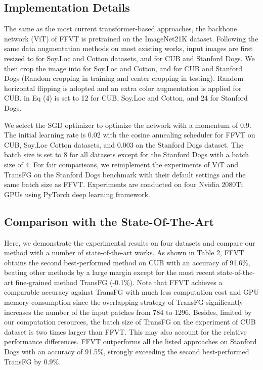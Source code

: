 \documentclass{bmvc2k}
\begin{document}
\subsection{Implementation Details}
The same as the most current transformer-based approaches, the backbone network (ViT) of FFVT is pretrained on the ImageNet21K dataset. Following the same data augmentation methods on most existing works, input images are first resized to  for Soy.Loc and Cotton datasets, and  for CUB and Stanford Dogs. We then crop the image into  for Soy.Loc and Cotton, and  for CUB and Stanford Dogs (Random cropping in training and center cropping in testing). Random horizontal flipping is adopted and an extra color augmentation is applied for CUB.  in Eq (4) is set to 12 for CUB, Soy.Loc and Cotton, and 24 for Stanford Dogs. 
\par
We select the SGD optimizer to optimize the network with a momentum of 0.9. The initial learning rate is 0.02 with the cosine annealing scheduler for FFVT on CUB, Soy.Loc Cotton datasets, and 0.003 on the Stanford Dogs dataset. The batch size is set to 8 for all datasets except for the Stanford Dogs with a batch size of 4. For fair comparisons, we reimplement the experiments of ViT and TransFG on the Stanford Dogs benchmark with their default settings and the same batch size as FFVT. Experiments are conducted on four Nvidia 2080Ti GPUs using PyTorch deep learning framework.


\subsection{Comparison with the State-Of-The-Art}
Here, we demonstrate the experimental results on four datasets and compare our method with a number of state-of-the-art works. As shown in Table 2, FFVT obtains the second best-performed method on CUB with an accuracy of 91.6\%, beating other methods by a large margin except for the most recent state-of-the-art fine-grained method TransFG (-0.1\%). Note that FFVT achieves a comparable accuracy against TransFG with much less computation cost and GPU memory consumption since the overlapping strategy of TransFG significantly increases the number of the input patches from 784 to 1296. Besides, limited by our computation resources, the batch size of TransFG on the experiment of CUB dataset is two times larger than FFVT. This may also account for the relative performance differences. FFVT outperforms all the listed approaches on Stanford Dogs with an accuracy of 91.5\%, strongly exceeding the second best-performed TransFG by 0.9\%. 
\end{document}
